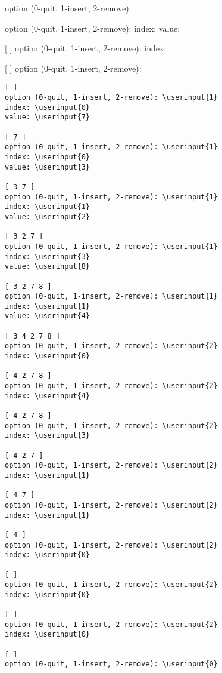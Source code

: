 \resett
\nextt
\begin{console}[frame=single, commandchars=\\\{\}]
[ ]
option (0-quit, 1-insert, 2-remove): 
\end{console}

\nextt
\begin{console}[frame=single, commandchars=\\\{\}]
[ ]
option (0-quit, 1-insert, 2-remove): 
index: 
value: 

[ ]
option (0-quit, 1-insert, 2-remove): 
index: 

[ ]
option (0-quit, 1-insert, 2-remove): 
\end{console}

\nextt
\vspace{-6pt}
\begin{Verbatim}[frame=single, fontsize=\footnotesize,commandchars=\\\{\}]
[ ]
option (0-quit, 1-insert, 2-remove): \userinput{1}
index: \userinput{0}
value: \userinput{7}

[ 7 ]
option (0-quit, 1-insert, 2-remove): \userinput{1}
index: \userinput{0}
value: \userinput{3}

[ 3 7 ]
option (0-quit, 1-insert, 2-remove): \userinput{1}
index: \userinput{1}
value: \userinput{2}

[ 3 2 7 ]
option (0-quit, 1-insert, 2-remove): \userinput{1}
index: \userinput{3}
value: \userinput{8}

[ 3 2 7 8 ]
option (0-quit, 1-insert, 2-remove): \userinput{1}
index: \userinput{1}
value: \userinput{4}

[ 3 4 2 7 8 ]
option (0-quit, 1-insert, 2-remove): \userinput{2}
index: \userinput{0}

[ 4 2 7 8 ]
option (0-quit, 1-insert, 2-remove): \userinput{2}
index: \userinput{4}

[ 4 2 7 8 ]
option (0-quit, 1-insert, 2-remove): \userinput{2}
index: \userinput{3}

[ 4 2 7 ]
option (0-quit, 1-insert, 2-remove): \userinput{2}
index: \userinput{1}

[ 4 7 ]
option (0-quit, 1-insert, 2-remove): \userinput{2}
index: \userinput{1}

[ 4 ]
option (0-quit, 1-insert, 2-remove): \userinput{2}
index: \userinput{0}

[ ]
option (0-quit, 1-insert, 2-remove): \userinput{2}
index: \userinput{0}

[ ]
option (0-quit, 1-insert, 2-remove): \userinput{2}
index: \userinput{0}

[ ]
option (0-quit, 1-insert, 2-remove): \userinput{0}
\end{Verbatim}


